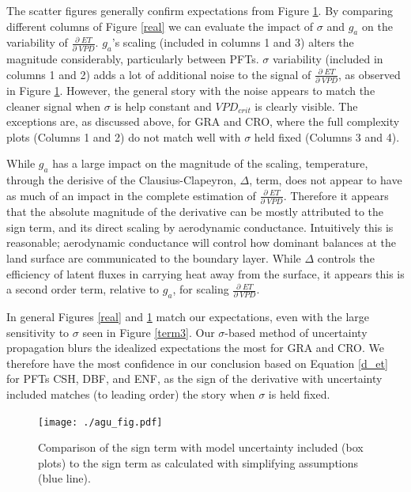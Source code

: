 \documentclass[draft,linenumbers]{agujournal}
\begin{document}
The scatter figures generally confirm expectations from Figure \ref{agu_fig}. By comparing different columns of Figure \ref{real} we can evaluate the impact of $\sigma$ and $g_a$ on the variability of $\frac{\partial \; ET}{\partial \; VPD}$. $g_a$'s scaling (included in columns 1 and 3) alters the magnitude considerably, particularly between PFTs. $\sigma$ variability (included in columns 1 and 2) adds a lot of additional noise to the signal of $\frac{\partial \; ET}{\partial \; VPD}$, as observed in Figure \ref{agu_fig}. However, the general story with the noise appears to match the cleaner signal when $\sigma$ is help constant and $VPD_{crit}$ is clearly visible. The exceptions are, as discussed above, for GRA and CRO, where the full complexity plots (Columns 1 and 2) do not match well with $\sigma$ held fixed (Columns 3 and 4).

While $g_a$ has a large impact on the magnitude of the scaling, temperature, through the derisive of the Clausius-Clapeyron, $\Delta$, term, does not appear to have as much of an impact in the complete estimation of $\frac{\partial \; ET}{\partial \; VPD}$. Therefore it appears that the absolute magnitude of the derivative can be mostly attributed to the sign term, and its direct scaling by aerodynamic conductance. Intuitively this is reasonable; aerodynamic conductance will control how dominant balances at the land surface are communicated to the boundary layer. While $\Delta$ controls the efficiency of latent fluxes in carrying heat away from the surface, it appears this is a second order term, relative to $g_a$, for scaling $\frac{\partial \; ET}{\partial \; VPD}$. 

In general Figures \ref{real} and \ref{agu_fig} match our expectations, even with the large sensitivity to $\sigma$ seen in Figure \ref{term3}. Our $\sigma$-based method of uncertainty propagation blurs the idealized expectations the most for GRA and CRO. We therefore have the most confidence in our conclusion based on Equation \ref{d_et} for PFTs CSH, DBF, and ENF, as the sign of the derivative with uncertainty included matches (to leading order) the story when $\sigma$ is held fixed.

\begin{figure}[h]
\centering
\texttt{[image: ./agu\_fig.pdf]}
\caption{Comparison of the sign term with model uncertainty included (box plots) to the sign term as calculated with simplifying assumptions (blue line).}
\label{agu_fig}
\end{figure}
\end{document}
